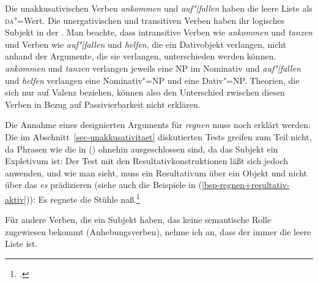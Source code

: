 \z
Die unakkusativischen Verben \emph{ankommen} und \emph{auf"|fallen} haben die leere Liste als \textsc{da}"=Wert.
Die unergativischen und transitiven Verben haben ihr logisches Subjekt in der \dalist.
Man beachte, dass intransitive Verben wie \emph{ankommen} und \emph{tanzen} und Verben
wie \emph{auf"|fallen} und \emph{helfen}, die ein Dativobjekt verlangen,
nicht anhand der Argumente, die sie verlangen, unterschieden werden können.
\Dh \emph{ankommen} und \emph{tanzen} verlangen jeweils eine NP im Nominativ und \emph{auf"|fallen}
und \emph{helfen} verlangen eine Nominativ"=NP und eine Dativ"=NP.
Theorien, die sich nur auf Valenz beziehen, können also den Unterschied zwischen diesen
Verben in Bezug auf Passivierbarkeit nicht erklären. 

Die Annahme eines designierten Arguments für \emph{regnen} muss noch erklärt werden:
Die im Abschnitt~\ref{sec-unakkusativitaet} diskutierten Tests greifen zum Teil nicht,
da Phrasen wie die in () ohnehin ausgeschlossen sind, da das Subjekt ein Expletivum ist:
\eal
{}
\zl
Der Test mit den Resultativkonstruktionen läßt sich jedoch anwenden, und wie man sieht,
muss ein Resultativum über ein Objekt und nicht über das \emph{es} prädizieren (siehe auch die Beispiele in
(\ref{bsp-regnen+resultativ-aktiv})):
\ea
Es regnete die Stühle naß.\footnote{
  .
}
\z

\noindent
Für andere Verben, die ein Subjekt haben, das keine semantische Rolle zugewiesen bekommt (Anhebungsverben),
nehme ich an, dass der \daw immer die leere Liste ist.



